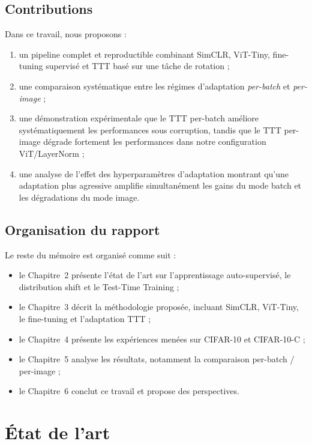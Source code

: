 \documentclass[12pt,a4paper]{report}
\begin{document}
	\section{Contributions}
	Dans ce travail, nous proposons :
	
	\begin{enumerate}
		\item un pipeline complet et reproductible combinant SimCLR, ViT-Tiny, fine-tuning supervisé et TTT basé sur une tâche de rotation ;
		\item une comparaison systématique entre les régimes d’adaptation \emph{per-batch} et \emph{per-image} ;
		\item une démonstration expérimentale que le TTT per-batch améliore systématiquement les performances sous corruption, tandis que le TTT per-image dégrade fortement les performances dans notre configuration ViT/LayerNorm ;
		\item une analyse de l’effet des hyperparamètres d’adaptation montrant qu’une adaptation plus agressive amplifie simultanément les gains du mode batch et les dégradations du mode image.
	\end{enumerate}
	
	\section{Organisation du rapport}
		Le reste du mémoire est organisé comme suit :
	
	\begin{itemize}
		\item le Chapitre~2 présente l’état de l’art sur l’apprentissage auto-supervisé, le distribution shift et le Test-Time Training ;
		\item le Chapitre~3 décrit la méthodologie proposée, incluant SimCLR, ViT-Tiny, le fine-tuning et l’adaptation TTT ;
		\item le Chapitre~4 présente les expériences menées sur CIFAR-10 et CIFAR-10-C ;
		\item le Chapitre~5 analyse les résultats, notamment la comparaison per-batch / per-image ;
		\item le Chapitre~6 conclut ce travail et propose des perspectives.
	\end{itemize}
	
	\chapter{État de l’art}
	
\end{document}
